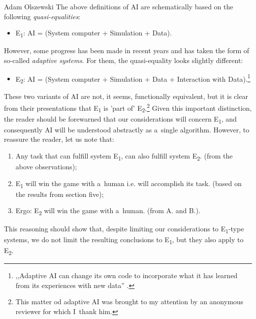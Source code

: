 \begin{artengenv}{Adam Olszewski}
The above definitions of AI are schematically based on the following \textit{quasi-equalities}:

\begin{itemize}
\item E\textsubscript{1}: AI = (System computer + Simulation + Data).
\end{itemize}
However, some progress has been made in recent years and has taken the form of so-called \textit{adaptive systems}. For them, the quasi-equality looks slightly different:

\begin{itemize}
\item E\textsubscript{2}: AI = (System computer + Simulation + Data + Interaction with Data).\footnote{,,Adaptive AI can change its own code to incorporate what it has learned from its experiences with new data''
\parencite[][]{kopera_how_2021}.%
}
\end{itemize}
These two variants of AI are not, it seems, functionally equivalent, but it is clear from their presentations that E\textsubscript{1} is 'part of' E\textsubscript{2}.\footnote{This matter od adaptive AI was brought to my attention by an anonymous reviewer for which I~thank him.} Given this important distinction, the reader should be forewarned that our considerations will concern E\textsubscript{1}, and consequently AI will be understood abstractly as a~single algorithm. However, to reassure the reader, let us note that:

\begin{enumerate}[label=\Alph*.]
\item Any task that can fulfill system E\textsubscript{1}, can also fulfill system E\textsubscript{2}. (from the above observations);
\item E\textsubscript{1} will win the game with a~human i.e. will accomplish its task. (based on the results from section five);
\item Ergo: E\textsubscript{2} will win the game with a~human. (from A. and B.).
\end{enumerate}
This reasoning should show that, despite limiting our considerations to E\textsubscript{1}{}-type systems, we do not limit the resulting conclusions to E\textsubscript{1}, but they also apply to E\textsubscript{2}.


\end{artengenv}
